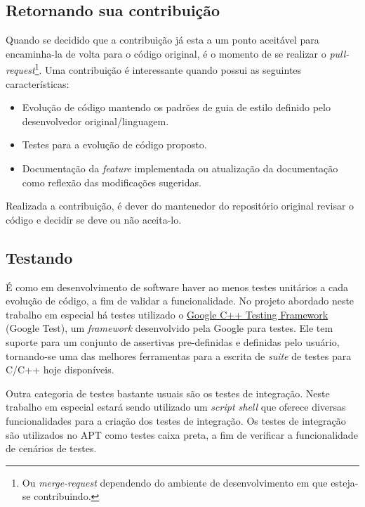 \subsection*{Retornando sua contribuição} %
\label{sub:retornando_sua_contribui_o}

Quando se decidido que a contribuição já esta a um ponto aceitável para encaminha-la de volta para o código original, é o momento de se realizar o \textit{pull-request}\footnote{Ou \textit{merge-request} dependendo do ambiente de desenvolvimento em que esteja-se contribuindo.}. Uma contribuição é interessante quando possui as seguintes características:


\begin{itemize}
	\item Evolução de código mantendo os padrões de guia de estilo definido pelo desenvolvedor original/linguagem.
	\item Testes para a evolução de código proposto.
	\item Documentação da \textit{feature} implementada ou atualização da documentação como reflexão das modificações sugeridas.
\end{itemize}

Realizada a contribuição, é dever do mantenedor do repositório original revisar o código e decidir se deve ou não aceita-lo.


\subsection*{Testando} %
\label{sub:testando}

É como em desenvolvimento de software haver ao menos testes unitários a cada evolução de código, a fim de validar a funcionalidade. No projeto abordado neste trabalho em especial há testes utilizado o \href{https://github.com/google/googletest}{Google C++ Testing Framework} (Google Test), um \textit{framework} desenvolvido pela Google para testes. Ele tem suporte para um conjunto de assertivas pre-definidas e definidas pelo usuário, tornando-se uma das melhores ferramentas para a escrita de \textit{suite} de testes para C/C++ hoje disponíveis.

Outra categoria de testes bastante usuais são os testes de integração. Neste trabalho em especial estará sendo utilizado um \textit{script shell} que oferece diversas funcionalidades para a criação dos testes de integração. Os testes de integração são utilizados no APT como testes caixa preta, a fim de verificar a funcionalidade de cenários de testes.

